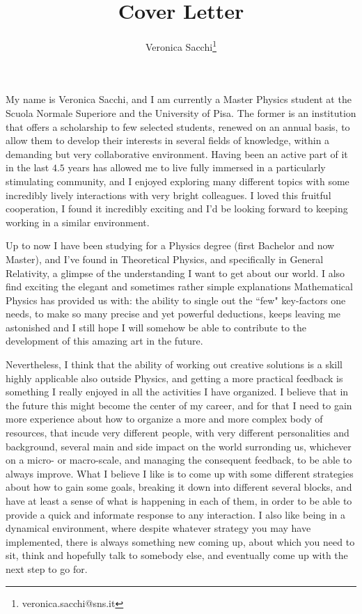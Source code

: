 \documentclass[12pt, a4paper]{article}
\title{Cover Letter}
\author{Veronica Sacchi\thanks{veronica.sacchi@sns.it}}
\begin{document}
\maketitle

My name is Veronica Sacchi, and I am currently a Master Physics student at the Scuola Normale Superiore and the University of Pisa. The former is an institution that offers a scholarship to few selected students, renewed on an annual basis, to allow them to develop their interests in several fields of knowledge, within a demanding but very collaborative environment.
Having been an active part of it in the last \(4.5\) years has allowed me to live fully immersed in a particularly stimulating community, and I enjoyed exploring many different topics with some incredibly lively interactions with very bright colleagues. I loved this fruitful cooperation, I found it incredibly exciting and I'd be looking forward to keeping working in a similar environment.

Up to now I have been studying for a Physics degree (first Bachelor and now Master), and I've found in Theoretical Physics, and specifically in General Relativity, a glimpse of the understanding I want to get about our world. 
I also find exciting the elegant and sometimes rather simple explanations Mathematical Physics has provided us with: the ability to single out the ``few" key-factors one needs, to make so many precise and yet powerful deductions, keeps leaving me astonished and I still hope I will somehow be able to contribute to the development of this amazing art in the future.

Nevertheless, I think that the ability of working out creative solutions is a skill highly applicable also outside Physics, and getting a more practical feedback is something I really enjoyed in all the activities I have organized.
I believe that in the future this might become the center of my career, and for that I need to gain more experience about how to organize a more and more complex body of resources, that incude very different people, with very different personalities and background, several main and side impact on the world surronding us, whichever on a micro- or macro-scale, and managing the consequent feedback, to be able to always improve.
What I believe I like is to come up with some different strategies about how to gain some goals, breaking it down into different several blocks, and have at least a sense of what is happening in each of them, in order to be able to provide a quick and informate response to any interaction. I also like being in a dynamical environment, where despite whatever strategy you may have implemented, there is always something new coming up, about which you need to sit, think and hopefully talk to somebody else, and eventually come up with the next step to go for.
\end{document}
